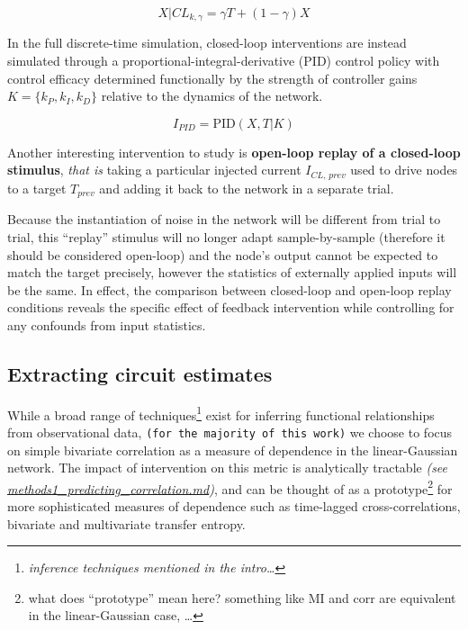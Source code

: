 \[ X | CL_{k, \gamma} = \gamma T + (1-\gamma) X
\]

In the full discrete-time simulation, closed-loop interventions are
instead simulated through a proportional-integral-derivative (PID)
control policy with control efficacy determined functionally by the
strength of controller gains \(K = \{k_P, k_I, k_D\}\) relative to the
dynamics of the network.

\[I_{PID} = \text{PID}(X,T| K)\]

Another interesting intervention to study is \textbf{open-loop replay of
a closed-loop stimulus}, \emph{that is} taking a particular injected
current \(I_{CL,\,prev}\) used to drive nodes to a target \(T_{prev}\)
and adding it back to the network in a separate trial.

Because the instantiation of noise in the network will be different from
trial to trial, this ``replay'' stimulus will no longer adapt
sample-by-sample (therefore it should be considered open-loop) and the
node's output cannot be expected to match the target precisely, however
the statistics of externally applied inputs will be the same. In effect,
the comparison between closed-loop and open-loop replay conditions
reveals the specific effect of feedback intervention while controlling
for any confounds from input statistics.

\hypertarget{extracting-circuit-estimates}{%
\subsection{Extracting circuit
estimates}\label{extracting-circuit-estimates}}

While a broad range of techniques\footnote{\emph{inference techniques
  mentioned in the intro\ldots{}}} exist for inferring functional
relationships from observational data,
\texttt{(for\ the\ majority\ of\ this\ work)} we choose to focus on
simple bivariate correlation as a measure of dependence in the
linear-Gaussian network. The impact of intervention on this metric is
analytically tractable \emph{(see
\url{methods1_predicting_correlation.md})}, and can be thought of as a
prototype\footnote{what does ``prototype'' mean here? something like MI
  and corr are equivalent in the linear-Gaussian case, \ldots{}} for
more sophisticated measures of dependence such as time-lagged
cross-correlations, bivariate and multivariate transfer entropy.

